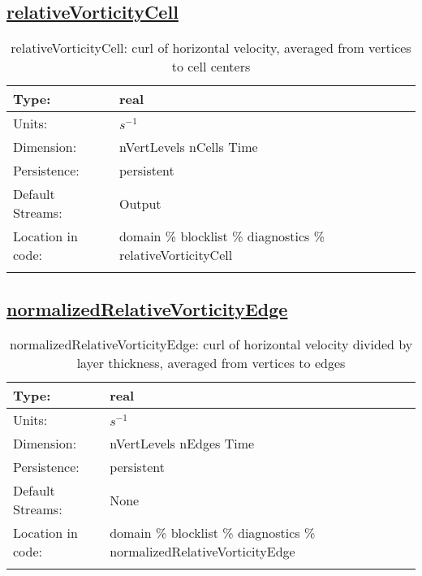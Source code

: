\subsection[relativeVorticityCell]{\hyperref[sec:var_tab_diagnostics]{relativeVorticityCell}}
\label{subsec:var_sec_diagnostics_relativeVorticityCell}
\begin{center}
\begin{longtable}{| p{2.0in} | p{4.0in} |}
        \hline 
        Type: & real \\
        \hline 
        Units: & $s^{-1}$ \\
        \hline 
        Dimension: & nVertLevels nCells Time \\
        \hline 
        Persistence: & persistent \\
        \hline 
		 Default Streams: & Output  \\
        \hline 
		 Location in code: & domain \% blocklist \% diagnostics \% relativeVorticityCell \\
		 \hline 
    \caption{relativeVorticityCell: curl of horizontal velocity, averaged from vertices to cell centers}
\end{longtable}
\end{center}
\subsection[normalizedRelativeVorticityEdge]{\hyperref[sec:var_tab_diagnostics]{normalizedRelativeVorticityEdge}}
\label{subsec:var_sec_diagnostics_normalizedRelativeVorticityEdge}
\begin{center}
\begin{longtable}{| p{2.0in} | p{4.0in} |}
        \hline 
        Type: & real \\
        \hline 
        Units: & $s^{-1}$ \\
        \hline 
        Dimension: & nVertLevels nEdges Time \\
        \hline 
        Persistence: & persistent \\
        \hline 
		 Default Streams: & None \\
        \hline 
		 Location in code: & domain \% blocklist \% diagnostics \% normalizedRelativeVorticityEdge \\
		 \hline 
    \caption{normalizedRelativeVorticityEdge: curl of horizontal velocity divided by layer thickness, averaged from vertices to edges}
\end{longtable}
\end{center}
